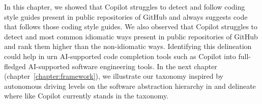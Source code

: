 In this chapter, we showed that Copilot struggles to detect and follow coding style guides present in public repositories of GitHub and always suggests code that follows those coding style guides. We also observed that Copilot struggles to detect and most common idiomatic ways present in public repositories of GitHub and rank them higher than the non-idiomatic ways. 
Identifying this delineation could help in urn AI-supported code completion tools such as Copilot into full-fledged AI-supported software engineering tools.
In the next chapter (chapter~\ref{chapter:framework}), we illustrate our taxonomy inspired by autonomous driving levels on the software abstraction hierarchy in \AISE{} and delineate where \cct{} like Copilot currently stands in the taxonomy. 
